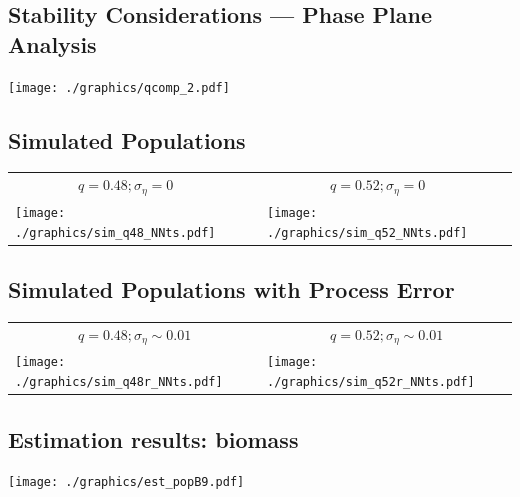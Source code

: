\documentclass[a4paper,KOMA,landscape,titlepage]{powersem}
\begin{document}
\begin{slide}\section{Stability Considerations --- Phase Plane Analysis}
\begin{center}
\texttt{[image: ./graphics/qcomp\_2.pdf]}
\end{center}
\end{slide}

\begin{slide}\section{Simulated Populations}
\begin{center}
\begin{tabular}{ll}
~~~~~~~~~$q=0.48; \sigma_\eta=0$ &~~~~~~~~~$q=0.52; \sigma_\eta=0$\\
\texttt{[image: ./graphics/sim\_q48\_NNts.pdf]}&
\texttt{[image: ./graphics/sim\_q52\_NNts.pdf]}\\
\end{tabular}
\end{center}
\end{slide}

\begin{slide}\section{Simulated Populations with Process Error}
\begin{center}
\begin{tabular}{ll}
~~~~~~~~~$q=0.48; \sigma_\eta\sim 0.01$ &~~~~~~~~~$q=0.52;
\sigma_\eta\sim 0.01$\\
\texttt{[image: ./graphics/sim\_q48r\_NNts.pdf]}&
\texttt{[image: ./graphics/sim\_q52r\_NNts.pdf]}\\
\end{tabular}
\end{center}
\end{slide}

\begin{slide}\section{Estimation results: biomass}
\begin{center}
\texttt{[image: ./graphics/est\_popB9.pdf]}
\end{center}
\end{slide}
\end{document}
